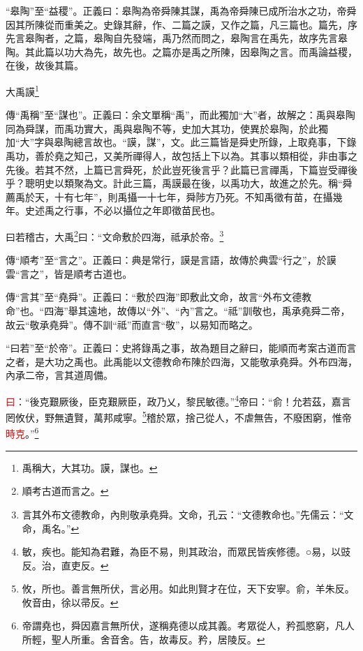 {\noindent\shu{}\fzkt “皋陶”至“益稷”。正義曰：皋陶為帝舜陳其謀，禹為帝舜陳已成所治水之功，帝舜因其所陳從而重美之。史錄其辭，作、二篇之謨，又作之篇，凡三篇也。篇先，序先言皋陶者，之篇，皋陶自先發端，禹乃然而問之，皋陶言在禹先，故序先言皋陶。其此篇以功大為先，故先也。之篇亦是禹之所陳，因皋陶之言。而禹論益稷，在後，故後其篇。 \par}

大禹謨\footnote{禹稱大，大其功。謨，謀也。}

{\noindent\zhuan{}\fzbyks 傳“禹稱”至“謀也”。正義曰：余文單稱“禹”，而此獨加“大”者，故解之：禹與皋陶同為舜謀，而禹功實大，禹與皋陶不等，史加大其功，使異於皋陶，於此獨加“大”字與皋陶總言故也。“謨，謀”，文。此三篇皆是舜史所錄，上取堯事，下錄禹功，善於堯之知己，又美所禪得人，故包括上下以為。其事以類相從，非由事之先後。若其不然，上篇已言舜死，於此豈死後言乎？此篇已言禪禹，下篇豈受禪後乎？聰明史以類聚為文。計此三篇，禹謨最在後，以禹功大，故進之於先。稱“舜薦禹於天，十有七年”，則禹攝一十七年，舜陟方乃死。不知禹徵有苗，在攝幾年。史述禹之行事，不必以攝位之年即徵苗民也。 \par}

曰若稽古，大禹\footnote{順考古道而言之。}曰：“文命敷於四海，祗承於帝。\footnote{言其外布文德教命，內則敬承堯舜。文命，孔云：“文德教命也。”先儒云：“文命，禹名。”}

{\noindent\zhuan{}\fzbyks 傳“順考”至“言之”。正義曰：典是常行，謨是言語，故傳於典雲“行之”，於謨雲“言之”，皆是順考古道也。 \par}

{\noindent\zhuan{}\fzbyks 傳“言其”至“堯舜”。正義曰：“敷於四海”即敷此文命，故言“外布文德教命”也。“四海”舉其遠地，故傳以“外”、“內”言之。“祗”訓敬也，禹承堯舜二帝，故云“敬承堯舜”。傳不訓“祗”而直言“敬”，以易知而略之。 \par}

{\noindent\shu{}\fzkt “曰若”至“於帝”。正義曰：史將錄禹之事，故為題目之辭曰，能順而考案古道而言之者，是大功之禹也。此禹能以文德教命布陳於四海，又能敬承堯舜。外布四海，內承二帝，言其道周備。 \par}

\textcolor{red}{曰}：“後克艱厥後，臣克艱厥臣，政乃乂，黎民敏德。”\footnote{敏，疾也。能知為君難，為臣不易，則其政治，而眾民皆疾修德。○易，以豉反。治，直吏反。}帝曰：“俞！允若茲，嘉言罔攸伏，野無遺賢，萬邦咸寧。\footnote{攸，所也。善言無所伏，言必用。如此則賢才在位，天下安寧。俞，羊朱反。攸音由，徐以帚反。}稽於眾，捨己從人，不虐無告，不廢困窮，惟帝\textcolor{red}{時克}。”\footnote{帝謂堯也，舜因嘉言無所伏，遂稱堯德以成其義。考眾從人，矜孤愍窮，凡人所輕，聖人所重。舍音舍。告，故毒反。矜，居陵反。}

